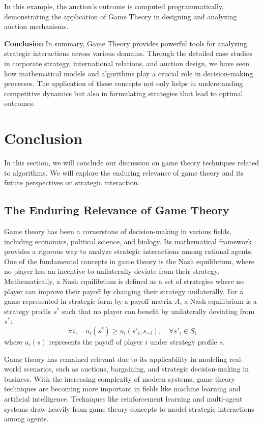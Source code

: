 \documentclass[12pt]{book} %
\begin{document}
In this example, the auction's outcome is computed programmatically, demonstrating the application of Game Theory in designing and analyzing auction mechanisms.

\textbf{Conclusion}
In summary, Game Theory provides powerful tools for analyzing strategic interactions across various domains. Through the detailed case studies in corporate strategy, international relations, and auction design, we have seen how mathematical models and algorithms play a crucial role in decision-making processes. The application of these concepts not only helps in understanding competitive dynamics but also in formulating strategies that lead to optimal outcomes.


\section{Conclusion}
In this section, we will conclude our discussion on game theory techniques related to algorithms. We will explore the enduring relevance of game theory and its future perspectives on strategic interaction.

\subsection{The Enduring Relevance of Game Theory}
Game theory has been a cornerstone of decision-making in various fields, including economics, political science, and biology. Its mathematical framework provides a rigorous way to analyze strategic interactions among rational agents. One of the fundamental concepts in game theory is the Nash equilibrium, where no player has an incentive to unilaterally deviate from their strategy. Mathematically, a Nash equilibrium is defined as a set of strategies where no player can improve their payoff by changing their strategy unilaterally. For a game represented in strategic form by a payoff matrix $A$, a Nash equilibrium is a strategy profile $s^*$ such that no player can benefit by unilaterally deviating from $s^*$:
\[
\forall i, \quad u_i(s^*) \geq u_i(s'_i, s_{-i}), \quad \forall s'_i \in S_i
\]
where $u_i(s)$ represents the payoff of player $i$ under strategy profile $s$.

Game theory has remained relevant due to its applicability in modeling real-world scenarios, such as auctions, bargaining, and strategic decision-making in business. With the increasing complexity of modern systems, game theory techniques are becoming more important in fields like machine learning and artificial intelligence. Techniques like reinforcement learning and multi-agent systems draw heavily from game theory concepts to model strategic interactions among agents.
\end{document}
